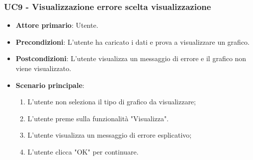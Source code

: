 \subsubsection{UC9 - Visualizzazione errore scelta visualizzazione}
\begin{itemize}
	\item \textbf{Attore primario}: Utente.
	\item \textbf{Precondizioni}: L'utente ha caricato i dati e prova a visualizzare un grafico.
	\item \textbf{Postcondizioni}: L'utente visualizza un messaggio di errore e il grafico non viene visualizzato.
	\item \textbf{Scenario principale}:
		\begin{enumerate}
		\item L'utente non seleziona il tipo di grafico da visualizzare;
		\item L'utente preme sulla funzionalità "Visualizza".
			\item L'utente visualizza un messaggio di errore esplicativo;
			\item L'utente clicca "OK" per continuare.
		\end{enumerate}
\end{itemize}